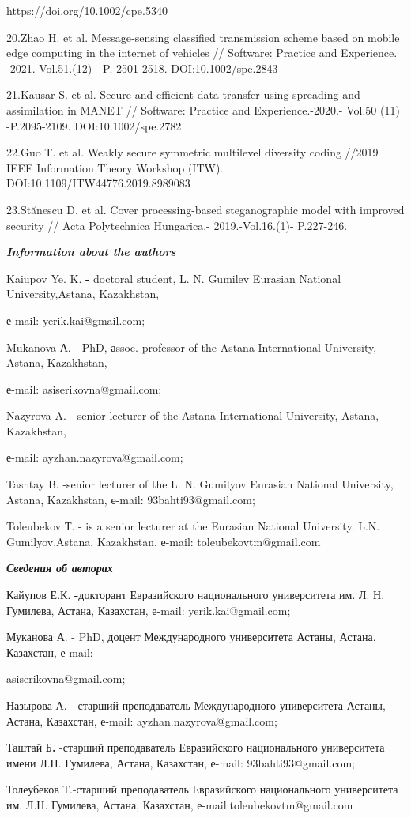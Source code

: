 \begin{noparindent}
https://doi.org/10.1002/cpe.5340

20.Zhao H. et al. Message‐sensing classified transmission scheme based
on mobile edge computing in the internet of vehicles // Software:
Practice and Experience. -2021.-Vol.51.(12) - P. 2501-2518.
DOI:10.1002/spe.2843

21.Kausar S. et al. Secure and efficient data transfer using spreading
and assimilation in MANET // Software: Practice and Experience.-2020.-
Vol.50 (11) -P.2095-2109. DOI:10.1002/spe.2782

22.Guo T. et al. Weakly secure symmetric multilevel diversity coding
//2019 IEEE Information Theory Workshop (ITW).
DOI:10.1109/ITW44776.2019.8989083

23.Stănescu D. et al. Cover processing-based steganographic model with
improved security // Acta Polytechnica Hungarica.- 2019.-Vol.16.(1)-
P.227-246.
\end{noparindent}

\emph{{\bfseries Information about the authors}}

\begin{noparindent}
Kaiupov Ye. K. {\bfseries -} doctoral student, L. N. Gumilev Eurasian
National University,Astana, Kazakhstan,

е-mail: yerik.kai@gmail.com;

Mukanova А. - PhD, аssoc. professor of the Astana International
University, Astana, Kazakhstan,

е-mail: asiserikovna@gmail.com;

Nazyrova A. - senior lecturer of the Astana International University,
Astana, Kazakhstan,

е-mail: ayzhan.nazyrova@gmail.com;

Tashtay B. -senior lecturer of the L. N. Gumilyov Eurasian National
University, Astana, Kazakhstan, е-mail: 93bahti93@gmail.com;

Toleubekov Т. - is a senior lecturer at the Eurasian National
University. L.N. Gumilyov,Astana, Kazakhstan, е-mail:
toleubekovtm@gmail.com
\end{noparindent}

\emph{{\bfseries Сведения об авторах}}

\begin{noparindent}
Кайупов Е.К. {\bfseries -}докторант Евразийского национального университета
им. Л. Н. Гумилева, Астана, Казахстан, е-mail: yerik.kai@gmail.com;

Муканова А. - PhD, доцент Международного университета Астаны, Астана,
Казахстан, е-mail:

asiserikovna@gmail.com;

Назырова А. - старший преподаватель Международного университета Астаны,
Астана, Казахстан, е-mail: ayzhan.nazyrova@gmail.com;

Таштай Б{\bfseries .} -старший преподаватель Евразийского национального
университета имени Л.Н. Гумилева, Астана, Казахстан, е-mail:
93bahti93@gmail.com;

Толеубеков Т.-старший преподаватель Евразийского национального
университета им. Л.Н. Гумилева, Астана, Казахстан,
е-mail:toleubekovtm@gmail.com
\end{noparindent}
